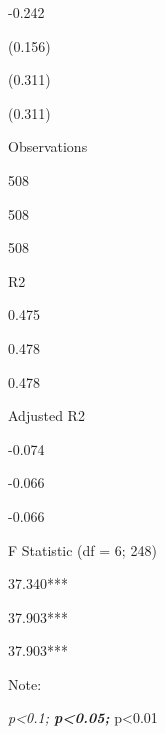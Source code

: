 \documentclass[
]{article}
\begin{document}
-0.242

(0.156)

(0.311)

(0.311)

Observations

508

508

508

R2

0.475

0.478

0.478

Adjusted R2

-0.074

-0.066

-0.066

F Statistic (df = 6; 248)

37.340***

37.903***

37.903***

Note:

\emph{p\textless0.1; \textbf{p\textless0.05; }}p\textless0.01
\end{document}
